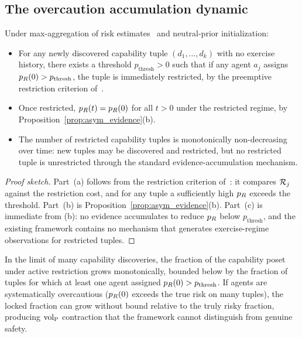\subsection{The overcaution accumulation dynamic}

\begin{proposition}
\label{prop:monotone_overcaution}
Under max-aggregation of risk estimates~\citep{lasser2026horizon}
and neutral-prior initialization:
\begin{itemize}
\item[(a)] For any newly discovered capability tuple $(d_1,
  \ldots, d_k)$ with no exercise history, there exists a
  threshold $p_{\mathrm{thresh}} > 0$ such that if any agent $a_j$
  assigns $p_R(0) > p_{\mathrm{thresh}}$, the tuple is
  immediately restricted, by the preemptive restriction
  criterion of~\citep[Proposition~1]{lasser2026horizon}.
\item[(b)] Once restricted, $p_R(t) = p_R(0)$ for all $t > 0$
  under the restricted regime, by
  Proposition~\ref{prop:asym_evidence}(b).
\item[(c)] The number of restricted capability tuples is
  monotonically non-decreasing over time: new tuples may be
  discovered and restricted, but no restricted tuple is
  unrestricted through the standard evidence-accumulation
  mechanism.
\end{itemize}
\end{proposition}

\begin{proof}[Proof sketch]
Part~(a) follows from the restriction criterion
of~\citep[Proposition~1]{lasser2026horizon}: it compares
$\mathcal{R}_j$ against the restriction cost, and for any tuple a
sufficiently high $p_R$ exceeds the threshold.  Part~(b) is
Proposition~\ref{prop:asym_evidence}(b).  Part~(c) is immediate
from (b): no evidence accumulates to reduce $p_R$ below
$p_{\mathrm{thresh}}$, and the existing framework contains no
mechanism that generates exercise-regime observations for
restricted tuples.
\end{proof}

\begin{corollary}
\label{cor:lockup}
In the limit of many capability discoveries, the fraction of the
capability poset under active restriction grows monotonically,
bounded below by the fraction of tuples for which at least one
agent assigned $p_R(0) > p_{\mathrm{thresh}}$.  If agents are
systematically overcautious ($p_R(0)$ exceeds the true risk on
many tuples), the locked fraction can grow without bound
relative to the truly risky fraction, producing ${\operatorname{vol}_{\mathrm{P}}}$
contraction that the framework cannot distinguish from genuine
safety.
\end{corollary}

